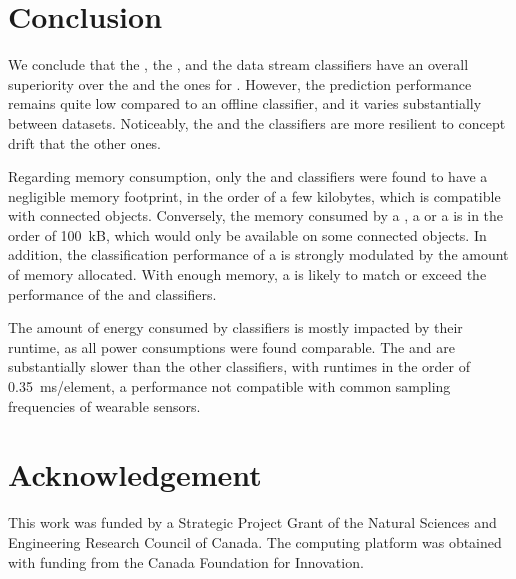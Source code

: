 \section{Conclusion}

We conclude that the \hoeffdingtree, the \mondrianforest, and the
\naivebayes data stream classifiers have an overall superiority over the
\FNN and the \mcnns ones for \har.  However, the prediction performance
remains quite low compared to an offline \knn classifier, and it varies
substantially between datasets. Noticeably, the \hoeffdingtree and the
\mcnns classifiers are more resilient to concept drift that the other ones.

Regarding memory consumption, only the \mcnn and \naivebayes classifiers
were found to have a negligible memory footprint, in the order of a few
kilobytes, which is compatible with connected objects. Conversely, the
memory consumed by a \mondrianforest, a \FNN or a \hoeffdingtree is in the
order of 100~kB, which would only be available on some connected objects.
In addition, the classification performance of a \mondrianforest is
strongly modulated by the amount of memory allocated. With enough memory, a
\mondrianforest is likely to match or exceed the performance of the
\hoeffdingtree and \naivebayes classifiers.

The amount of energy consumed by classifiers is mostly impacted by their
runtime, as all power consumptions were found comparable. The
\hoeffdingtree and \mondrianforest are substantially slower than the other
classifiers, with runtimes in the order of 0.35~ms/element, a performance not compatible 
with common sampling frequencies of wearable sensors. 


\section*{Acknowledgement}
This work was funded by a Strategic Project Grant of the Natural Sciences
and Engineering Research Council of Canada. The computing platform was
obtained with funding from the Canada Foundation for Innovation.


